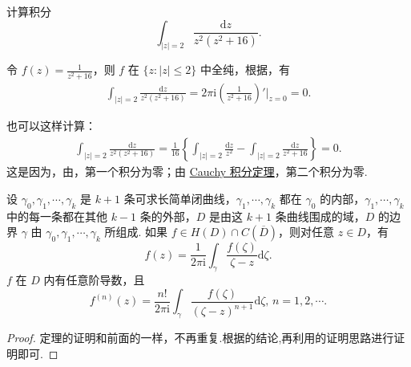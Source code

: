 \documentclass[../../main.tex]{subfiles}
\begin{document}
\begin{example}
计算积分
\[
\int_{|z| = 2} \frac{\mathrm{d}z}{z^2(z^2 + 16)}.
\]
\end{example}
\begin{solution}
令 \( f(z) = \frac{1}{z^2 + 16} \)，则 \( f \) 在 \( \{z: |z| \leqslant 2\} \) 中全纯，根据，有
\begin{align*}
\int_{|z| = 2} \frac{\mathrm{d}z}{z^2(z^2 + 16)} = 2\pi \mathrm{i} \left( \frac{1}{z^2 + 16} \right)' \bigg|_{z = 0} = 0.
\end{align*}

也可以这样计算：
\begin{align*}
\int_{|z| = 2} \frac{\mathrm{d}z}{z^2(z^2 + 16)} = \frac{1}{16} \left\{ \int_{|z| = 2} \frac{\mathrm{d}z}{z^2} - \int_{|z| = 2} \frac{\mathrm{d}z}{z^2 + 16} \right\} = 0.
\end{align*}
这是因为，由，第一个积分为零；由 \hyperref[theorem:Cauchy-Goursat定理(Cauchy积分定理)]{Cauchy 积分定理}，第二个积分为零. 

\end{solution}

\begin{theorem}\label{theorem:定理3.4.6}
设 \( \gamma_0, \gamma_1, \cdots, \gamma_k \) 是 \( k + 1 \) 条可求长简单闭曲线，\( \gamma_1, \cdots, \gamma_k \) 都在 \( \gamma_0 \) 的内部，\( \gamma_1, \cdots, \gamma_k \) 中的每一条都在其他 \( k - 1 \) 条的外部，\( D \) 是由这 \( k + 1 \) 条曲线围成的域，\( D \) 的边界 \( \gamma \) 由 \( \gamma_0, \gamma_1, \cdots, \gamma_k \) 所组成. 如果 \( f \in H(D) \cap C(\overline{D}) \)，则对任意 \( z \in D \)，有
\[
f(z) = \frac{1}{2\pi \mathrm{i}} \int_{\gamma} \frac{f(\zeta)}{\zeta - z} \mathrm{d}\zeta.
\]
\( f \) 在 \( D \) 内有任意阶导数，且
\[
f^{(n)}(z) = \frac{n!}{2\pi \mathrm{i}} \int_{\gamma} \frac{f(\zeta)}{(\zeta - z)^{n + 1}} \mathrm{d}\zeta, \, n = 1, 2, \cdots.
\]
\end{theorem}
\begin{proof}
定理的证明和前面的一样，不再重复.根据的结论,再利用的证明思路进行证明即可.

\end{proof}
\end{document}
